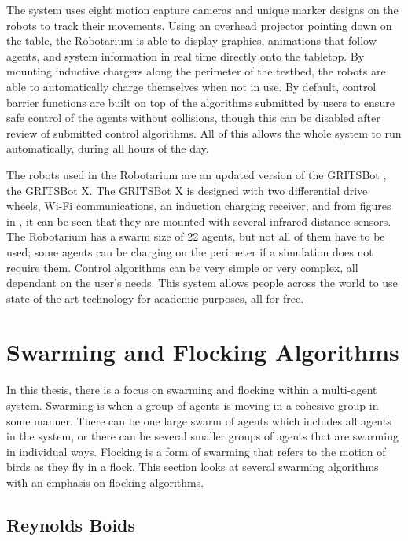 The system uses eight motion capture cameras and unique marker designs on the robots to track their movements. Using an overhead projector pointing down on the table, the Robotarium is able to display graphics, animations that follow agents, and system information in real time directly onto the tabletop. By mounting inductive chargers along the perimeter of the testbed, the robots are able to automatically charge themselves when not in use. By default, control barrier functions are built on top of the algorithms submitted by users to ensure safe control of the agents without collisions, though this can be disabled after review of submitted control algorithms. All of this allows the whole system to run automatically, during all hours of the day.

The robots used in the Robotarium are an updated version of the GRITSBot \cite{pickem2015gritsbot}, the GRITSBot X. The GRITSBot X is designed with two differential drive wheels, Wi-Fi communications, an induction charging receiver, and from figures in \cite{wilson2020robotarium}, it can be seen that they are mounted with several infrared distance sensors. The Robotarium has a swarm size of 22 agents, but not all of them have to be used; some agents can be charging on the perimeter if a simulation does not require them. Control algorithms can be very simple or very complex, all dependant on the user's needs. This system allows people across the world to use state-of-the-art technology for academic purposes, all for free.

\section{Swarming and Flocking Algorithms}

In this thesis, there is a focus on swarming and flocking within a multi-agent system. Swarming is when a group of agents is moving in a cohesive group in some manner. There can be one large swarm of agents which includes all agents in the system, or there can be several smaller groups of agents that are swarming in individual ways. Flocking is a form of swarming that refers to the motion of birds as they fly in a flock. This section looks at several swarming algorithms with an emphasis on flocking algorithms.

\subsection{Reynolds Boids}
\label{sec:boids}


